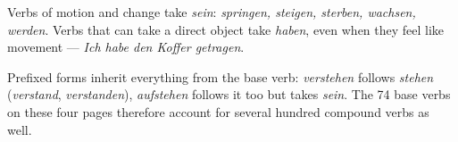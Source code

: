 \begin{gnote}
Verbs of motion and change take \textit{sein}: \textit{springen, steigen,
sterben, wachsen, werden}. Verbs that can take a direct object take
\textit{haben}, even when they feel like movement — \textit{Ich habe den Koffer
getragen}.
\end{gnote}

\begin{gnote}
Prefixed forms inherit everything from the base verb: \textit{verstehen} follows
\textit{stehen} (\textit{verstand}, \textit{verstanden}), \textit{aufstehen}
follows it too but takes \textit{sein}. The 74 base verbs on these four pages
therefore account for several hundred compound verbs as well.
\end{gnote}
